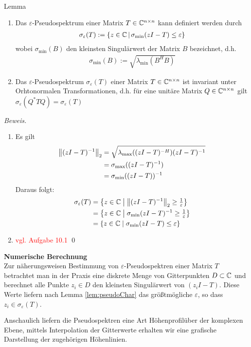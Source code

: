 \begin{colbox}{Lemma}\label{lem:pseudoChar}
  \begin{enumerate}
    \item 
      Das $\varepsilon$-Pseudospektrum einer Matrix $T\in\mathbb C  ^{n\times n}$ kann definiert werden 
      durch
      \begin{align*}
        \sigma_\varepsilon(T) 
        := \{z\in\mathbb C  \,|\,\sigma_{\min}(zI-T)\leq\varepsilon\}
      \end{align*}
      wobei $\sigma_{\min}(B)$ den kleinsten Singulärwert der Matrix $B$ bezeichnet, d.h. 
      \begin{align*}
        \sigma_{\min}(B) := \sqrt{\lambda_{\min}(B^HB)}
      \end{align*}
    \item 
      Das $\varepsilon$-Pseudospektrum $\sigma_\varepsilon(T)$ einer Matrix $T\in\mathbb C  ^{n\times n}$ ist 
      invariant unter Orhtonormalen Transformationen, d.h. für eine unitäre Matrix $Q\in\mathbb C  ^{n\times n}$ 
      gilt $\sigma_\varepsilon(Q^*TQ) = \sigma_\varepsilon(T)$
  \end{enumerate}
\end{colbox}

\textit{Beweis.} 
\begin{enumerate}
  \item 
    Es gilt
    \begin{align*}
      \vertn{2}{(zI-T)^{-1}}_2  
      &= \sqrt{\lambda_{\max}((zI-T)^{-H})(zI-T)^{-1}} \\
      &= \sigma_{\max}((zI-T)^{-1}) \\ 
      &= \sigma_{\min}((zI-T))^{-1} \\ 
    \end{align*}
    Daraus folgt:
    \begin{align*}
      \sigma_\varepsilon(T) 
      &= \left\{ z \in \C   \;\middle|\; \vertn{2}{(zI-T)^{-1}}_2 \geq \tfrac{1}{\varepsilon} \right\} \\
      &= \left\{ z \in \C   \;\middle|\; \sigma_{\min}(zI-T)^{-1} \geq \tfrac{1}{\varepsilon} \right\} \\
      &= \left\{ z \in \C   \;\middle|\; \sigma_{\min}(zI-T) \leq \varepsilon \right\}
    \end{align*}
  \item \textcolor{red}{vgl. Aufgabe 10.1}
  \qed
\end{enumerate}

\textbf{Numerische Berechnung}\\
Zur näherungsweisen Bestimmung von $\varepsilon$-Pseudospektren einer Matrix $T$ betrachtet man in der Praxis eine 
diskrete Menge von Gitterpunkten $D\subset \mathbb C$ und berechnet alle Punkte $z_i\in D$ den kleinsten Singulärwert 
von $(z_i I - T)$. Diese Werte liefern nach Lemma \ref{lem:pseudoChar} das größtmögliche $\varepsilon$, so dass 
$z_i\in \sigma_{\varepsilon}(T)$. 

Anschaulich liefern die Pseudospektren eine Art Höhenprofilüber der komplexen Ebene, mittels Interpolation 
der Gitterwerte erhalten wir eine grafische Darstellung der zugehörigen Höhenlinien.
